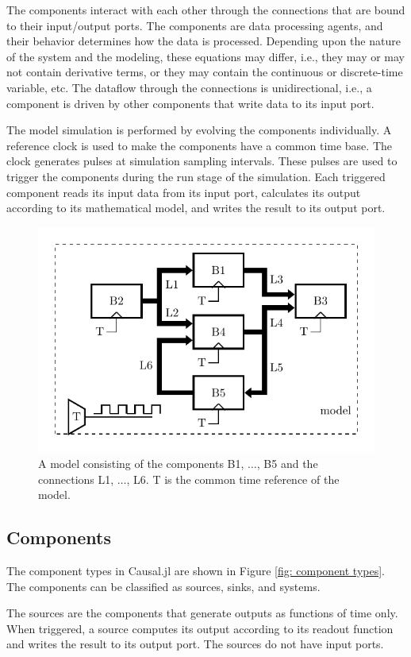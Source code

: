\documentclass{juliacon}
\begin{document}
The components interact with each other through the connections that are bound to their input/output ports. The components are data processing agents, and their behavior determines how the data is processed. Depending upon the nature of the system and the modeling, these equations may differ, i.e., they may or may not contain derivative terms, or they may contain the continuous or discrete-time variable, etc. The dataflow through the connections is unidirectional, i.e., a component is driven by other components that write data to its input port.

The model simulation is performed by evolving the components individually. A reference clock is used to make the components have a common time base. The clock generates pulses at simulation sampling intervals. These pulses are used to trigger the components during the run stage of the simulation. Each triggered component reads its input data from its input port, calculates its output according to its mathematical model, and writes the result to its output port.

\begin{figure}
    \centering
    \includegraphics[width=0.75\linewidth]{figures/Model/model.pdf}
    \caption{A model consisting of the components B1, $\ldots$, B5 and the connections L1, $\ldots$, L6. T is the common time reference of the model.}
    \label{fig: simple model}
\end{figure}

\subsection{Components}

The component types in Causal.jl are shown in Figure \ref{fig: component types}. The components can be classified as sources, sinks, and systems.

The sources are the components that generate outputs as functions of time only. When triggered, a source computes its output according to its readout function and writes the result to its output port. The sources do not have input ports.
\end{document}
